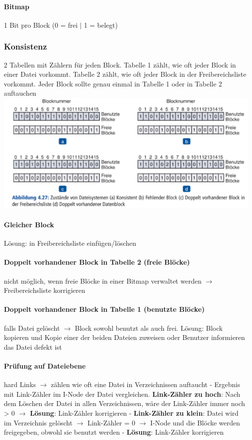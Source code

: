 \documentclass[11pt,a4paper,landscape]{article}
\begin{document}
\begin{multicols*}{3}
	\paragraph{Bitmap} 1 Bit pro Block (0 = frei $\vert$ 1 = belegt)
	\subsubsection{Konsistenz}
	2 Tabellen mit Zählern für jeden Block. Tabelle 1 zählt, wie oft jeder Block in einer Datei vorkommt. Tabelle 2 zählt, wie oft jeder Block in der Freibereichsliste vorkommt. Jeder Block sollte genau einmal in Tabelle 1 oder in Tabelle 2 auftauchen\\
	\includegraphics[width=0.95\columnwidth]{konsistenz}
	\paragraph{Gleicher Block} Lösung: in Freibereichsliste einfügen/löschen
	\paragraph{Doppelt vorhandener Block in Tabelle 2 (freie Blöcke)} nicht möglich, wenn freie Blöcke in einer Bitmap verwaltet werden $\rightarrow$ Freibereichsliste korrigieren
	\paragraph{Doppelt vorhandener Block in Tabelle 1 (benutzte Blöcke)} falls Datei gelöscht $\rightarrow$ Block sowohl benutzt als auch frei. Lösung: Block kopieren und Kopie einer der beiden Dateien zuweisen oder Benutzer informieren das Datei defekt ist
	\paragraph{Prüfung auf Dateiebene} hard Links $\rightarrow$ zählen wie oft eine Datei in Verzeichnissen auftaucht - Ergebnis mit Link-Zähler im I-Node der Datei vergleichen. \textbf{Link-Zähler zu hoch}: Nach dem Löschen der Datei in allen Verzeichnissen, wäre der Link-Zähler immer noch > 0 $\rightarrow$ \textbf{Lösung}: Link-Zähler korrigieren - \textbf{Link-Zähler zu klein}: Datei wird im Verzeichnis gelöscht $\rightarrow$ Link-Zähler = 0 $\rightarrow$ I-Node und die Blöcke werden freigegeben, obwohl sie benutzt werden - \textbf{Lösung}: Link-Zähler korrigieren

\end{multicols*}
\end{document}
